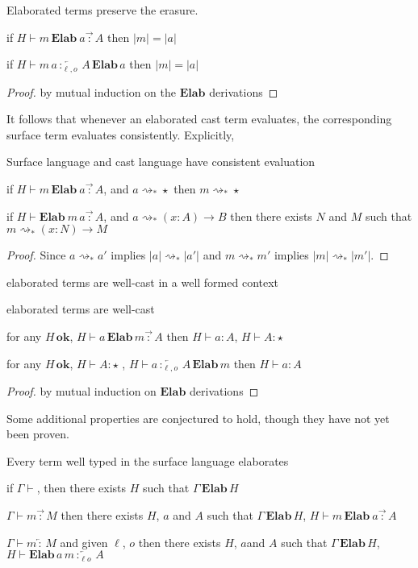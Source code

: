 \begin{thm}
Elaborated terms preserve the erasure.
 
if $H\vdash m\,\textbf{Elab}\ a\overrightarrow{\,:\,}A$ then $|m|=|a|$
 
if $H\vdash m\,a\overleftarrow{\,:_{\ell,o}\,}A\,\textbf{Elab}\,a$ then $|m|=|a|$
\end{thm}
 
\begin{proof}
by mutual induction on the $\textbf{Elab}$ derivations
\end{proof}

It follows that whenever an elaborated cast term evaluates, the corresponding surface term evaluates consistently.
Explicitly,
\begin{thm}
Surface language and cast language have consistent evaluation
 
if $H\vdash m\,\textbf{Elab}\ a\overrightarrow{\,:\,}A$, and $a\rightsquigarrow_{*}\star$ then $m\rightsquigarrow_{*}\star$
 
if $H\vdash\textbf{Elab}\ m\,a\overrightarrow{\,:\,}A$, and $a\rightsquigarrow_{*}(x:A)\rightarrow B$ then there exists $N$ and $M$ such that $m\rightsquigarrow_{*}(x:N)\rightarrow M$
\end{thm}


\begin{proof}
Since $a\rightsquigarrow_{*}a'$ implies $|a|\rightsquigarrow_{*}|a'|$ and $m\rightsquigarrow_{*}m'$ implies $|m|\rightsquigarrow_{*}|m'|$.
\end{proof}
elaborated terms are well-cast in a well formed context 
\begin{thm}
elaborated terms are well-cast
 
for any $H\,\textbf{ok}$, $H\vdash a\,\textbf{Elab}\,m\overrightarrow{\,:\,}A$ then $H\vdash a:A$, $H\vdash A:\star$
 
for any $H\,\textbf{ok}$, $H\vdash A:\star$ , $H\vdash a\overleftarrow{\,:_{\ell,o}\,}A\,\textbf{Elab}\,m$ then $H\vdash a:A$
\end{thm}
 
\begin{proof}
by mutual induction on $\textbf{Elab}$ derivations
 

\end{proof}
Some additional properties are conjectured to hold, though they have not yet been proven.
\begin{conjecture}
Every term well typed in the \bidir{} surface language elaborates
 
if $\Gamma\vdash$, then there exists $H$ such that $\Gamma\,\textbf{Elab}\,H$
 
$\Gamma\vdash m\overrightarrow{\,:\,}M$ then there exists $H$, $a$ and $A$ such that $\Gamma\,\textbf{Elab}\,H$, $H\vdash m\,\textbf{Elab}\ a\overrightarrow{\,:\,}A$
 
$\Gamma\vdash m\overleftarrow{\,:\,}M$ and given $\ell$, $o$ then there exists $H$, $a$and $A$ such that $\Gamma\,\textbf{Elab}\,H$, $H\vdash\textbf{Elab}\,a\,m\overleftarrow{\,:_{\ell o}\,}A$
\end{conjecture}
 
